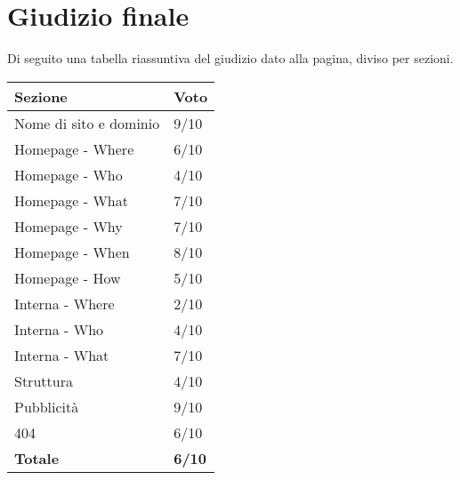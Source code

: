 \newpage
\section{Giudizio finale}
Di seguito una tabella riassuntiva del giudizio dato alla pagina, diviso per sezioni.


\begin{table}[htbp]
\centering
\begin{tabular}{|l|l|}
\hline
Sezione                & Voto \\ \hline
Nome di sito e dominio & 9/10    \\
Homepage - Where       & 6/10    \\
Homepage - Who         & 4/10    \\
Homepage - What        & 7/10    \\
Homepage - Why         & 7/10    \\
Homepage - When        & 8/10    \\
Homepage - How         & 5/10    \\
Interna - Where        & 2/10    \\
Interna - Who          & 4/10    \\
Interna - What         & 7/10    \\
Struttura              & 4/10    \\
Pubblicità             & 9/10    \\
404                    & 6/10    \\ \hline
\textbf{Totale}        & \textbf{6/10}    \\ \hline
\end{tabular}
\end{table}

